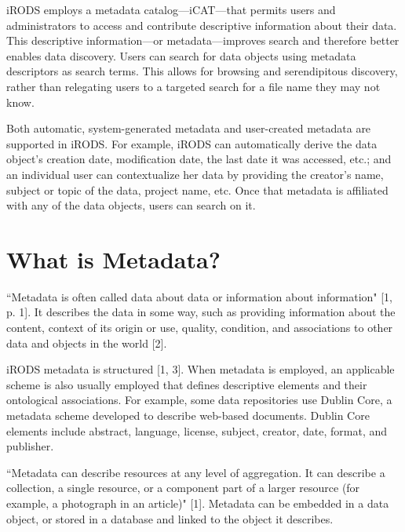 \documentclass[10pt,oneside]{memoir}
\begin{document}
iRODS employs a metadata catalog---iCAT---that permits users and administrators to access and contribute descriptive information about their data. This descriptive information---or metadata---improves search and therefore better enables data discovery. Users can search for data objects using metadata descriptors as search terms. This allows for browsing and serendipitous discovery, rather than relegating users to a targeted search for a file name they may not know.

Both automatic, system-generated metadata and user-created metadata are supported in iRODS. For example, iRODS can automatically derive the data object's creation date, modification date, the last date it was accessed, etc.; and an individual user can contextualize her data by providing the creator's name, subject or topic of the data, project name, etc. Once that metadata is affiliated with any of the data objects, users can search on it.

\section{What is Metadata?}

``Metadata is often called data about data or information about information" [1, p. 1]. It describes the data in some way, such as providing information about the content, context of its origin or use, quality, condition, and associations to other data and objects in the world [2].

iRODS metadata is structured [1, 3]. When metadata is employed, an applicable scheme is also usually employed that defines descriptive elements and their ontological associations. For example, some data repositories use Dublin Core, a metadata scheme developed to describe web-based documents. Dublin Core elements include abstract, language, license, subject, creator, date, format, and publisher.

``Metadata can describe resources at any level of aggregation. It can describe a collection, a single resource, or a component part of a larger resource (for example, a photograph in an article)" [1]. Metadata can be embedded in a data object, or stored in a database and linked to the object it describes.
\end{document}
